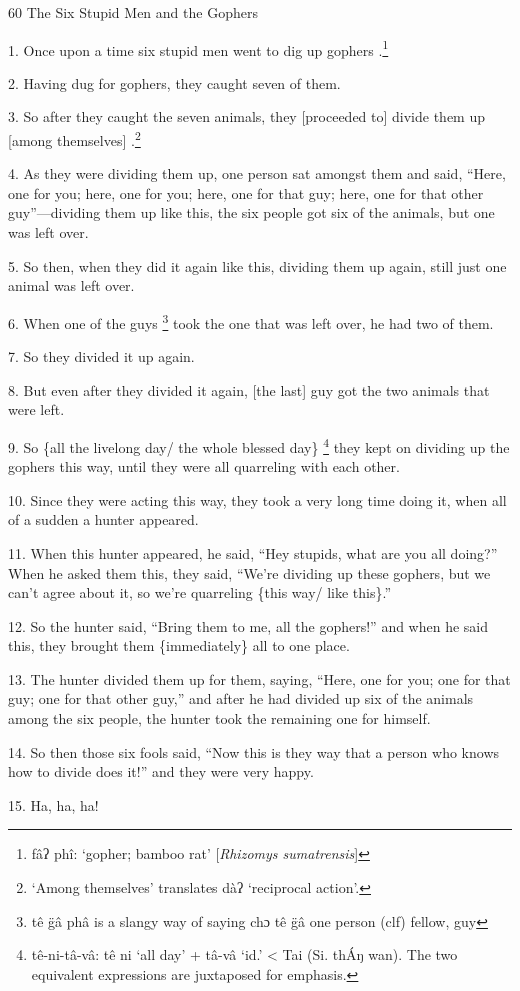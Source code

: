 
60 The Six Stupid Men and the Gophers

1. Once upon a time six stupid men went to dig up gophers .\footnote{fâʔ phî: `gopher; bamboo rat' [\textit{Rhizomys sumatrensis}]}

2. Having dug for gophers, they caught seven of them.

3. So after they caught the seven animals, they [proceeded to] divide them up [among
themselves] .\footnote{`Among themselves' translates dàʔ `reciprocal action'.}

4. As they were dividing them up, one person sat amongst them and said, ``Here,
one for you; here, one for you; here, one for that guy; here, one for that other
guy''---dividing them up like this, the six people got six of the animals, but
one was left over.

5. So then, when they did it again like this, dividing them up again, still just
one animal was left over.

6. When one of the guys \footnote{tê   g̈â   phâ is a slangy way of saying chɔ tê g̈â  one  person (clf)  fellow, guy} took the one that was left over, he had two of them.

7. So they divided it up again.

8. But even after they divided it again, [the last] guy got the two animals that
were left.

9. So \{all the livelong day/ the whole blessed day\} \footnote{tê-ni-tâ-vâ: tê ni `all day' + tâ-vâ `id.' < Tai (Si. thÁŋ wan).  The two equivalent expressions are juxtaposed for emphasis.} they kept on dividing
up the gophers this way, until they were all quarreling with each other.

10. Since they were acting this way, they took a very long time doing it, when
all of a sudden a hunter appeared.

11. When this hunter appeared, he said, ``Hey stupids, what are you all doing?''
When he asked them this, they said, ``We're dividing up these gophers, but we can't
agree about it, so we're quarreling \{this way/ like this\}.''

12. So the hunter said, ``Bring them to me, all the gophers!'' and when he said
this, they brought them \{immediately\} all to one place.

13. The hunter divided them up for them, saying, ``Here, one for you; one for that
guy; one for that other guy,'' and after he had divided up six of the animals among
the six people, the hunter took the remaining one for himself.

14. So then those six fools said, ``Now this is they way that a person who knows
how to divide does it!'' and they were very happy.

15. Ha, ha, ha!

